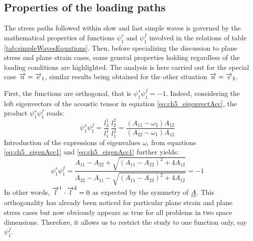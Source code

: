 
\subsection{Properties of the loading paths}
The stress paths followed within slow and fast simple waves is governed by the mathematical properties of functions $\psi^s_1$ and $\psi^f_1$ involved in the relations of table \ref{tab:simpleWavesEquations}.
Then, before specializing the discussion to plane stress and plane strain cases, some general properties holding regardless of the loading conditions are highlighted.
The analysis is here carried out for the special case ${\overrightarrow{n}}={\overrightarrow{e}}_1$, similar results being obtained for the other situation ${\overrightarrow{n}}={\overrightarrow{e}}_2$.

First, the functions are orthogonal, that is $\psi^s_1\psi^f_1=-1$.
Indeed, considering the left eigenvectors of the acoustic tensor in equation \eqref{eq:ch5_eigenvectAcc}, the product $\psi^s_1\psi^f_1$ reads:
\begin{equation*}
  \psi^s_1\psi^f_1 = \frac{l^1_2}{l^1_1}\: \frac{l_2^2}{l^2_1} = \frac{(A_{11}-\omega_2)A_{12}}{(A_{22}-\omega_1)A_{12}}
\end{equation*}
Introduction of the expressions of eigenvalues $\omega_i$ from equations \eqref{eq:ch5_eigenAcc1} and \eqref{eq:ch5_eigenAcc1} further yields:
\begin{equation*}
  \psi^s_1\psi^f_1 = \frac{A_{11} -A_{22} +\sqrt{(A_{11} -A_{22} )^2 + 4A_{12} }}{A_{22} -A_{11} -\sqrt{(A_{11} -A_{22} )^2 + 4A_{12} }}=-1
\end{equation*}
In other words, ${\overrightarrow{l}}^1 \cdot {\overrightarrow{l}}^2=0$ as expected by the symmetry of ${\underline{\underline{A}}}$.
This orthogonality has already been noticed for particular plane strain and plane stress cases \cite{Clifton,Ting68} but now obviously appears as true for all problems in two space dimensions.
Therefore, it allows us to restrict the study to one function only, say $\psi_1^f$.

